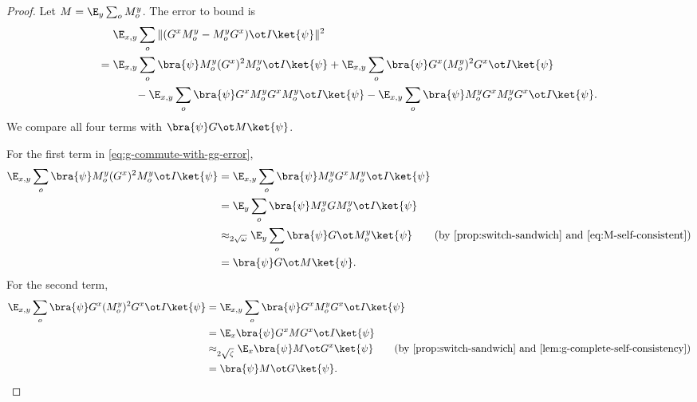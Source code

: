 \begin{proof}
	\leanok
	Let $M = \E_y \sum_o M_o^y$. The error to bound is
	\begin{align}
		    & \E_{x,y} \sum_o \|(G^xM_o^y - M_o^yG^x)\ot I \ket{\psi}\|^2 \nonumber \\
		={} & \E_{x,y} \sum_o \bra{\psi} M_o^y (G^x)^2 M_o^y \ot I \ket{\psi}
		+ \E_{x,y} \sum_o \bra{\psi} G^x (M_o^y)^2 G^x \ot I \ket{\psi} \nonumber   \\
		    & \qquad
		- \E_{x,y} \sum_o \bra{\psi} G^x M_o^y G^x M_o^y \ot I \ket{\psi}
		- \E_{x,y} \sum_o \bra{\psi} M_o^y G^x M_o^y G^x \ot I \ket{\psi}.
		\label{eq:g-commute-with-gg-error}
	\end{align}
	We compare all four terms with $\bra{\psi} G \ot M \ket{\psi}$.

	For the first term in \ref{eq:g-commute-with-gg-error},
	\begin{align*}
		\E_{x,y} \sum_o \bra{\psi} M_o^y (G^x)^2 M_o^y \ot I \ket{\psi}
		 & =
		\E_{x,y} \sum_o \bra{\psi} M_o^y G^x M_o^y \ot I \ket{\psi}               \\
		 & =
		\E_y \sum_o \bra{\psi} M_o^y G M_o^y \ot I \ket{\psi}                     \\
		 & \approx_{2\sqrt{\omega}} \E_y \sum_o \bra{\psi} G \ot M_o^y \ket{\psi}
		\tag{by \ref{prop:switch-sandwich} and \ref{eq:M-self-consistent}}        \\
		 & =
		\bra{\psi} G \ot M \ket{\psi}.
	\end{align*}
	For the second term,
	\begin{align*}
		\E_{x,y} \sum_o \bra{\psi} G^x (M_o^y)^2 G^x \ot I \ket{\psi}
		 & =
		\E_{x,y} \sum_o \bra{\psi} G^x M_o^y G^x \ot I \ket{\psi}                     \\
		 & =
		\E_x \bra{\psi} G^x M G^x \ot I \ket{\psi}                                    \\
		 & \approx_{2\sqrt{\zeta}} \E_x \bra{\psi} M \ot G^x \ket{\psi}
		\tag{by \ref{prop:switch-sandwich} and \ref{lem:g-complete-self-consistency}} \\
		 & =
		\bra{\psi} M \ot G \ket{\psi}.
	\end{align*}


\end{proof}
